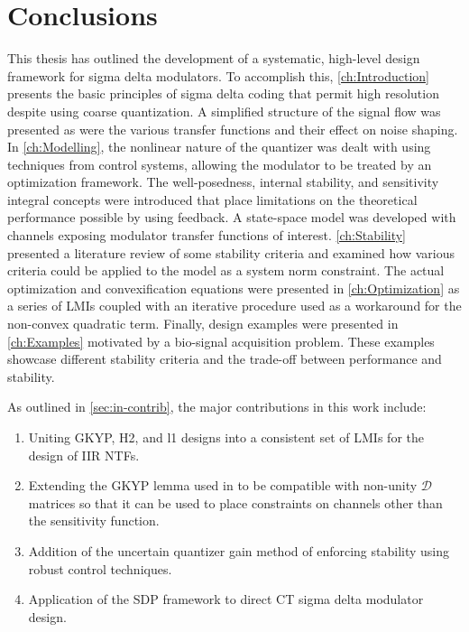 
\chapter{Conclusions}
\label{ch:Conclusions}

This thesis has outlined the development of a systematic, high-level design framework for sigma delta modulators. To accomplish this, \autoref{ch:Introduction} presents the basic principles of sigma delta coding that permit high resolution despite using coarse quantization. A simplified structure of the signal flow was presented as were the various transfer functions and their effect on noise shaping. In \autoref{ch:Modelling}, the nonlinear nature of the quantizer was dealt with using techniques from control systems, allowing the modulator to be treated by an optimization framework. The well-posedness, internal stability, and sensitivity integral concepts were introduced that place limitations on the theoretical performance possible by using feedback. A state-space model was developed with channels exposing modulator transfer functions of interest. \autoref{ch:Stability} presented a literature review of some stability criteria and examined how various criteria could be applied to the model as a system norm constraint. The actual optimization and convexification equations were presented in \autoref{ch:Optimization} as a series of \gls{LMI}s coupled with an iterative procedure used as a workaround for the non-convex quadratic term. Finally, design examples were presented in \autoref{ch:Examples} motivated by a bio-signal acquisition problem. These examples showcase different stability criteria and the trade-off between performance and stability.

As outlined in \autoref{sec:in-contrib}, the major contributions in this work include:

\begin{enumerate}
	\item Uniting \gls{GKYP}, \gls{H2}, and \gls{l1} designs into a consistent set of \gls{LMI}s for the design of \gls{IIR} \gls{NTF}s.
	\item Extending the \gls{GKYP} lemma used in \cite{Li2014} to be compatible with non-unity $\mathcal{D}$ matrices so that it can be used to place constraints on channels other than the sensitivity function.
	\item Addition of the uncertain quantizer gain method of enforcing stability using robust control techniques.
	\item Application of the \gls{SDP} framework to direct \gls{CT} sigma delta modulator design.
\end{enumerate}

